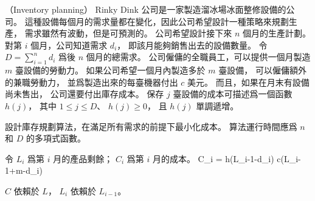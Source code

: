 \startPROBLEM
（Inventory planning）
Rinky Dink 公司是一家製造溜冰場冰面整修設備的公司。
這種設備每個月的需求量都在變化，因此公司希望設計一種策略來規劃生產，
需求雖然有波動，但是可預測的。
公司希望設計接下來 $n$ 個月的生產計劃。
對第 $i$ 個月，公司知道需求 $d_i$，
即該月能夠銷售出去的設備數量。
令 $D=\sum_{i=1}^{n} d_i$ 爲後 $n$ 個月的總需求。
公司僱傭的全職員工，可以提供一個月製造 $m$ 臺設備的勞動力。
如果公司希望一個月內製造多於 $m$ 臺設備，
可以僱傭額外的兼職勞動力，
並爲製造出來的每臺機器付出 $c$ 美元。
而且，如果在月末有設備尚未售出，
公司還要付出庫存成本。
保存 $j$ 臺設備的成本可描述爲一個函數 $h(j)$，
其中 $1\le j \le D$、 $h(j)\ge 0$，
且 $h(j)$ 單調遞增。

設計庫存規劃算法，在滿足所有需求的前提下最小化成本。
算法運行時間應爲 $n$ 和 $D$ 的多項式函數。
\stopPROBLEM

\startANSWER
令 $L_i$ 爲第 $i$ 月的產品剩餘； $C_i$ 爲第 $i$ 月的成本。
\startformula
C_i = \startcases
\NC h(L_{i-1}-d_i) \NC {} \NR
{} \NC {} \NR
\NC c\times (L_{i-1}+m-d_i) \NC {} \NR
\stopcases
\stopformula

$C$ 依賴於 $L$， $L_i$ 依賴於 $L_{i-1}$。
\stopANSWER
